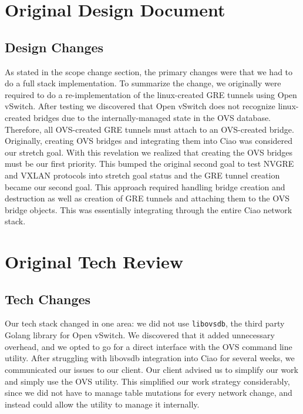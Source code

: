 \documentclass[10pt,onecolumn,journal,draftclsnofoot]{IEEEtran}
\begin{document}
\section{Original Design Document}


\subsection{Design Changes}
As stated in the scope change section, the primary changes were that we had to do a full stack
implementation. To summarize the change, we originally were required to do a re-implementation
of the linux-created GRE tunnels using Open vSwitch. After testing we discovered that Open vSwitch
does not recognize linux-created bridges due to the internally-managed state in the OVS database.
Therefore, all OVS-created GRE tunnels must attach to an OVS-created bridge. Originally, creating
OVS bridges and integrating them into Ciao was considered our stretch goal. With this revelation
we realized that creating the OVS bridges must be our first priority. This bumped the original
second goal to test NVGRE and VXLAN protocols into stretch goal status and the GRE tunnel creation
became our second goal. This approach required handling bridge creation and destruction as well
as creation of GRE tunnels and attaching them to the OVS bridge objects. This was essentially
integrating through the entire Ciao network stack.

\section{Original Tech Review}


\subsection{Tech Changes}
Our tech stack changed in one area: we did not use \texttt{libovsdb}, the third party Golang
library for Open vSwitch. We discovered that it added unnecessary overhead, and we opted to go
for a direct interface with the OVS command line utility. After struggling with libovsdb integration
into Ciao for several weeks, we communicated our issues to our client. Our client advised us to
simplify our work and simply use the OVS utility. This simplified our work strategy considerably,
since we did not have to manage table mutations for every network change, and instead could allow
the utility to manage it internally.
\end{document}
